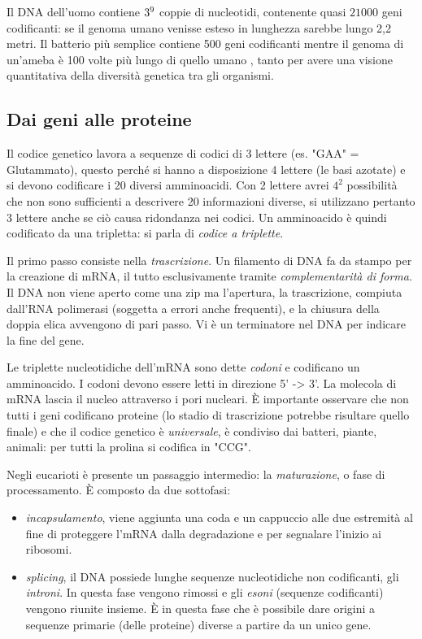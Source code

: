 Il DNA dell'uomo contiene $3\time10^{9}$ coppie di nucleotidi, contenente quasi $21000$ geni codificanti: se il genoma umano venisse esteso in lunghezza sarebbe lungo 2,2 metri. Il batterio più semplice contiene 500 geni codificanti mentre il genoma di un'ameba è 100 volte più lungo di quello umano \supercite{alberts2018essential}, tanto per avere una visione quantitativa della diversità genetica tra gli organismi.


\subsection{Dai geni alle proteine}

Il codice genetico lavora a sequenze di codici di 3 lettere (es. "GAA" = Glutammato), questo perché si hanno a disposizione 4 lettere (le basi azotate) e si devono codificare i 20 diversi amminoacidi. Con 2 lettere avrei $4^{2}$ possibilità che non sono sufficienti a descrivere 20 informazioni diverse, si utilizzano pertanto 3 lettere anche se ciò causa ridondanza nei codici. Un amminoacido è quindi codificato da una tripletta: si parla di \textit{codice a triplette}. \\

\par Il primo passo consiste nella \textit{trascrizione}. Un filamento di DNA fa da stampo per la creazione di mRNA, il tutto esclusivamente tramite \textit{complementarità di forma}. Il DNA non viene aperto come una zip ma l'apertura, la trascrizione, compiuta dall'RNA polimerasi (soggetta a errori anche frequenti), e la chiusura della doppia elica avvengono di pari passo. Vi è un terminatore nel DNA per indicare la fine del gene. 

\par Le triplette nucleotidiche dell'mRNA sono dette \textit{codoni} e codificano un amminoacido. I codoni devono essere letti in direzione 5' -> 3'. La molecola di mRNA lascia il nucleo attraverso i pori nucleari. È importante osservare che non tutti i geni codificano proteine (lo stadio di trascrizione potrebbe risultare quello finale) e che il codice genetico è \textit{universale}, è condiviso dai batteri, piante, animali: per tutti la prolina si codifica in "CCG".

\par Negli eucarioti è presente un passaggio intermedio: la \textit{maturazione}, o fase di processamento. È composto da due sottofasi:
\begin{itemize}
	\item \textit{incapsulamento}, viene aggiunta una coda e un cappuccio alle due estremità al fine di proteggere l'mRNA dalla degradazione e per segnalare l'inizio ai ribosomi.
	\item \textit{splicing}, il DNA possiede lunghe sequenze nucleotidiche non codificanti, gli \textit{introni}. In questa fase vengono rimossi e gli \textit{esoni} (sequenze codificanti) vengono riunite insieme. È in questa fase che è possibile dare origini a sequenze primarie (delle proteine) diverse a partire da un unico gene.
\end{itemize}

